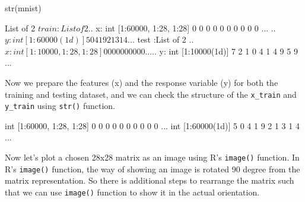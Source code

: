\documentclass[
  12pt,
]{krantz}
\makeatletter
\newenvironment{Shaded}{\begin{snugshade}}{\end{snugshade}}
\newcommand{\FunctionTok}[1]{\textcolor[rgb]{0,0,0}{#1}}
\newcommand{\NormalTok}[1]{#1}
\newcommand{\OtherTok}[1]{\textcolor[rgb]{0.37,0.37,0.37}{#1}}
\newcommand{\SpecialCharTok}[1]{\textcolor[rgb]{0,0,0}{#1}}
\newenvironment{kframe}{%
\medskip{}
\setlength{\fboxsep}{.8em}
 \def\at@end@of@kframe{}%
 \ifinner\ifhmode%
  \def\at@end@of@kframe{\end{minipage}}%
  \begin{minipage}{\columnwidth}%
 \fi\fi%
 \def\FrameCommand##1{\hskip\@totalleftmargin \hskip-\fboxsep
 \colorbox{shadecolor}{##1}\hskip-\fboxsep
     \hskip-\linewidth \hskip-\@totalleftmargin \hskip\columnwidth}%
 \MakeFramed {\advance\hsize-\width
   \@totalleftmargin\z@ \linewidth\hsize
   \@setminipage}}%
 {\par\unskip\endMakeFramed%
 \at@end@of@kframe}
\renewenvironment{Shaded}{\begin{kframe}}{\end{kframe}}
\makeatother
\begin{document}
\begin{Shaded}
\begin{Highlighting}[]
\FunctionTok{str}\NormalTok{(mnist)}
\end{Highlighting}
\end{Shaded}

\begin{Shaded}
\begin{Highlighting}[]
\NormalTok{List of 2}
\NormalTok{ $ train:List of 2}
\NormalTok{  ..$ x: int [1:60000, 1:28, 1:28] 0 0 0 0 0 0 0 0 0 0 ...}
\NormalTok{  ..$ y: int [1:60000(1d)] 5 0 4 1 9 2 1 3 1 4 ...}
\NormalTok{ $ test :List of 2}
\NormalTok{  ..$ x: int [1:10000, 1:28, 1:28] 0 0 0 0 0 0 0 0 0 0 ...}
\NormalTok{  ..$ y: int [1:10000(1d)] 7 2 1 0 4 1 4 9 5 9 ...}
\end{Highlighting}
\end{Shaded}

Now we prepare the features (x) and the response variable (y) for both the training and testing dataset, and we can check the structure of the \texttt{x\_train} and \texttt{y\_train} using \texttt{str()} function.

\begin{Shaded}
\end{Shaded}

\begin{Shaded}
\begin{Highlighting}[]
\NormalTok{int [1:60000, 1:28, 1:28] 0 0 0 0 0 0 0 0 0 0 ...}
\NormalTok{int [1:60000(1d)] 5 0 4 1 9 2 1 3 1 4 ...}
\end{Highlighting}
\end{Shaded}

Now let's plot a chosen 28x28 matrix as an image using R's \texttt{image()} function. In R's \texttt{image()} function, the way of showing an image is rotated 90 degree from the matrix representation. So there is additional steps to rearrange the matrix such that we can use \texttt{image()} function to show it in the actual orientation.
\end{document}
